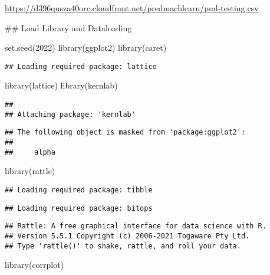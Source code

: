 \documentclass[
]{article}
\newenvironment{Shaded}{\begin{snugshade}}{\end{snugshade}}
\newcommand{\DecValTok}[1]{\textcolor[rgb]{0.00,0.00,0.81}{#1}}
\newcommand{\FunctionTok}[1]{\textcolor[rgb]{0.00,0.00,0.00}{#1}}
\newcommand{\NormalTok}[1]{#1}
\begin{document}
\url{https://d396qusza40orc.cloudfront.net/predmachlearn/pml-testing.csv}

\#\# Load Library and Dataloading

\begin{Shaded}
\begin{Highlighting}[]
\FunctionTok{set.seed}\NormalTok{(}\DecValTok{2022}\NormalTok{)}
\FunctionTok{library}\NormalTok{(ggplot2)}
\FunctionTok{library}\NormalTok{(caret)}
\end{Highlighting}
\end{Shaded}

\begin{verbatim}
## Loading required package: lattice
\end{verbatim}

\begin{Shaded}
\begin{Highlighting}[]
\FunctionTok{library}\NormalTok{(lattice)}
\FunctionTok{library}\NormalTok{(kernlab)}
\end{Highlighting}
\end{Shaded}

\begin{verbatim}
## 
## Attaching package: 'kernlab'
\end{verbatim}

\begin{verbatim}
## The following object is masked from 'package:ggplot2':
## 
##     alpha
\end{verbatim}

\begin{Shaded}
\begin{Highlighting}[]
\FunctionTok{library}\NormalTok{(rattle)}
\end{Highlighting}
\end{Shaded}

\begin{verbatim}
## Loading required package: tibble
\end{verbatim}

\begin{verbatim}
## Loading required package: bitops
\end{verbatim}

\begin{verbatim}
## Rattle: A free graphical interface for data science with R.
## Version 5.5.1 Copyright (c) 2006-2021 Togaware Pty Ltd.
## Type 'rattle()' to shake, rattle, and roll your data.
\end{verbatim}

\begin{Shaded}
\begin{Highlighting}[]
\FunctionTok{library}\NormalTok{(corrplot)}
\end{Highlighting}
\end{Shaded}
\end{document}
